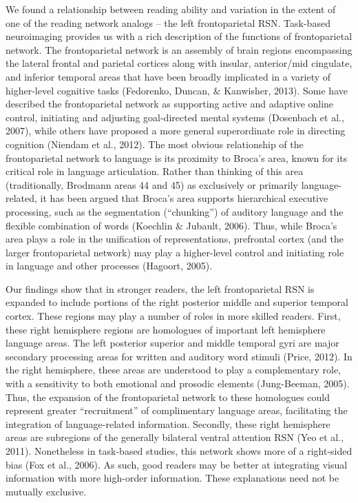 We found a relationship between reading ability and variation in the extent of one of the reading network analogs – the left frontoparietal RSN. Task-based neuroimaging provides us with a rich description of the functions of frontoparietal network. The frontoparietal network is an assembly of brain regions encompassing the lateral frontal and parietal cortices along with insular, anterior/mid cingulate, and inferior temporal areas that have been broadly implicated in a variety of higher-level cognitive tasks (Fedorenko, Duncan, & Kanwisher, 2013). Some have described the frontoparietal network as supporting active and adaptive online control, initiating and adjusting goal-directed mental systems (Dosenbach et al., 2007), while others have proposed a more general superordinate role in directing cognition (Niendam et al., 2012). The most obvious relationship of the frontoparietal network to language is its proximity to Broca’s area, known for its critical role in language articulation. Rather than thinking of this area (traditionally, Brodmann areas 44 and 45) as exclusively or primarily language-related, it has been argued that Broca’s area supports hierarchical executive processing, such as the segmentation (“chunking”) of auditory language and the flexible combination of words (Koechlin & Jubault, 2006). Thus, while Broca’s area plays a role in the unification of representations, prefrontal cortex (and the larger frontoparietal network) may play a higher-level control and initiating role in language and other processes (Hagoort, 2005). 

Our findings show that in stronger readers, the left frontoparietal RSN is expanded to include portions of the right posterior middle and superior temporal cortex.  These regions may play a number of roles in more skilled readers.  First, these right hemisphere regions are homologues of important left hemisphere language areas. The left posterior superior and middle temporal gyri are major secondary processing areas for written and auditory word stimuli (Price, 2012). In the right hemisphere, these areas are understood to play a complementary role, with a sensitivity to both emotional and prosodic elements (Jung-Beeman, 2005). Thus, the expansion of the frontoparietal network to these homologues could represent greater “recruitment” of complimentary language areas, facilitating  the integration of language-related information.  Secondly, these right hemisphere areas are subregions of the generally bilateral ventral attention RSN (Yeo et al., 2011).  Nonetheless in task-based studies, this network shows more of a right-sided bias (Fox et al., 2006).  As such, good readers may be better at integrating visual information with more high-order information.  These explanations need not be mutually exclusive.

